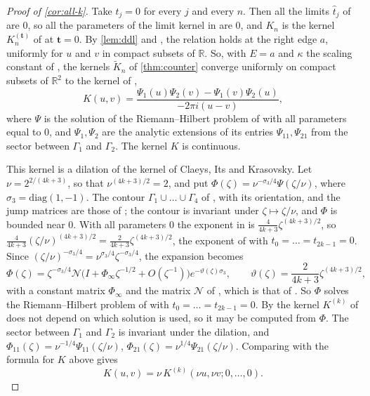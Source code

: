 \documentclass[11pt]{article}
\theoremstyle{remark}
\newcommand{\R}{\mathbb{R}}
\begin{document}
\begin{proof}[Proof of \cref{cor:all-k}]
Take $t_j=0$ for every $j$ and every $n$. Then all the limits $\widehat t_j$ of \cite[(1.63)]{DDL} are $0$, so all the
parameters of the limit kernel in \cite[Theorem~1.9]{DDL} are $0$, and $K_n$ is the kernel $K_n^{(\mathbf t)}$ of
\cite[(1.3)]{DDL} at $\mathbf t=0$. By \cref{lem:ddl} and \cite[Theorem~1.9]{DDL}, the relation \cite[(1.24)]{DDL}
holds at the right edge $a$, uniformly for $u$ and $v$ in compact subsets of $\R$. So, with $E=a$ and $\kappa$ the scaling
constant of \cite[Theorem~1.9]{DDL}, the kernels $\widetilde K_n$ of \cref{thm:counter} converge uniformly on compact
subsets of $\R^2$ to the kernel of \cite[(1.25)]{DDL},
\[
K(u,v)=\frac{\Psi_1(u)\Psi_2(v)-\Psi_1(v)\Psi_2(u)}{-2\pi i(u-v)},
\]
where $\Psi$ is the solution of the Riemann--Hilbert problem of \cite[Section~1.4]{DDL} with all
parameters equal to $0$, and $\Psi_1,\Psi_2$ are the analytic extensions of its entries $\Psi_{11},\Psi_{21}$ from the sector
between $\Gamma_1$ and $\Gamma_2$. The kernel $K$ is continuous.

This kernel is a dilation of the kernel of Claeys, Its and Krasovsky. Let $\nu=2^{2/(4k+3)}$, so that
$\nu^{(4k+3)/2}=2$, and put $\Phi(\zeta)=\nu^{-\sigma_3/4}\Psi(\zeta/\nu)$, where $\sigma_3=\mathrm{diag}(1,-1)$. The contour $\Gamma_1\cup\dots\cup\Gamma_4$ of
\cite[Section~1.4]{DDL}, with its orientation, and the jump matrices \cite[(1.33)--(1.35)]{DDL} are those of
\cite[(1.16)--(1.18)]{CIK}; the contour is invariant under $\zeta\mapsto\zeta/\nu$, and $\Phi$ is bounded near $0$. With
all parameters $0$ the exponent in \cite[(1.38)]{DDL} is $\frac{4}{4k+3}\zeta^{(4k+3)/2}$, so
$\frac4{4k+3}(\zeta/\nu)^{(4k+3)/2}=\frac2{4k+3}\zeta^{(4k+3)/2}$, the exponent of \cite[(1.21)]{CIK} with
$t_0=\dots=t_{2k-1}=0$. Since $(\zeta/\nu)^{-\sigma_3/4}=\nu^{\sigma_3/4}\zeta^{-\sigma_3/4}$, the expansion
\cite[(1.36)]{DDL} becomes
\[
\Phi(\zeta)=\zeta^{-\sigma_3/4}\mathcal N\bigl(I+\Phi_\infty\zeta^{-1/2}+O(\zeta^{-1})\bigr)e^{-\vartheta(\zeta)\sigma_3},\qquad
\vartheta(\zeta)=\frac{2}{4k+3}\zeta^{(4k+3)/2},
\]
with a constant matrix $\Phi_\infty$ and the matrix $\mathcal N$ of \cite[(1.37)]{DDL}, which is that of \cite[(1.20)]{CIK}. So
$\Phi$ solves the Riemann--Hilbert problem of \cite[Section~1]{CIK} with $t_0=\dots=t_{2k-1}=0$. By
\cite[Remark~1.4]{CIK} the kernel $K^{(k)}$ of \cite[(1.14)]{CIK} does not depend on which solution is used, so it may be
computed from $\Phi$. The sector between $\Gamma_1$ and $\Gamma_2$ is invariant under the dilation, and
$\Phi_{11}(\zeta)=\nu^{-1/4}\Psi_{11}(\zeta/\nu)$, $\Phi_{21}(\zeta)=\nu^{1/4}\Psi_{21}(\zeta/\nu)$. Comparing
\cite[(1.14)]{CIK} with the formula for $K$ above gives
\[
K(u,v)=\nu\,K^{(k)}(\nu u,\nu v;0,\dots,0).
\]


\end{proof}
\end{document}
